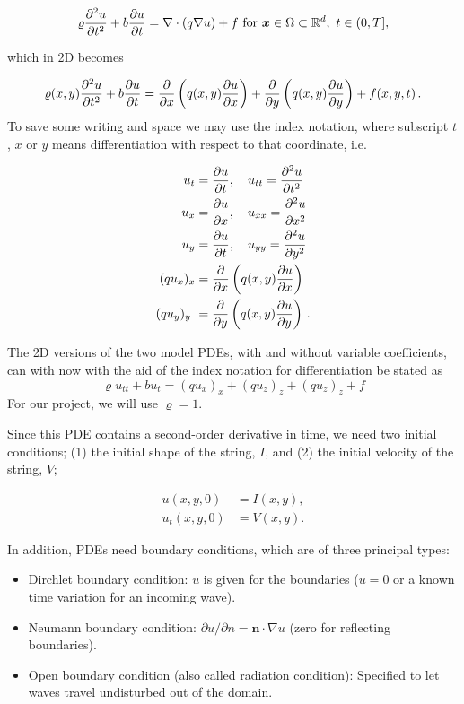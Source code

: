 \documentclass[letterpaper,10pt,english]{/usr/share/sphinx/texinputs/sphinxhowto}
\begin{document}
\[
\varrho\frac{\partial^2 u}{\partial t^2} +b \frac{\partial u}{\partial t} = \nabla\cdot (q\nabla u) + f\hbox{ for }\boldsymbol{x}\in\Omega\subset\mathbb{R}^d,\ t\in (0,T],
\]

which in 2D becomes

\[
\varrho(x,y)
\frac{\partial^2 u}{\partial t^2} +b \frac{\partial u}{\partial t} =
\frac{\partial}{\partial x}\left( q(x,y)
\frac{\partial u}{\partial x}\right)
+
\frac{\partial}{\partial y}\left( q(x,y)
\frac{\partial u}{\partial y}\right)
+ f(x,y,t)
\thinspace .
\] To save some writing and space we may use the index notation, where
subscript $t$, $x$ or $y$ means differentiation with respect to that
coordinate, i.e.

\begin{align*}
u_{t} &=\frac{\partial u}{\partial t} ,
\quad u_{tt} =\frac{\partial^2 u}{\partial t^2}\\
u_{x} &=\frac{\partial u}{\partial x} ,
\quad u_{xx} =\frac{\partial^2 u}{\partial x^2}\\
u_{y} &=\frac{\partial u}{\partial t} ,
\quad u_{yy} =\frac{\partial^2 u}{\partial y^2}\\
(q u_x)_x &= \frac{\partial}{\partial x}\left( q(x,y)
\frac{\partial u}{\partial x}\right)
\\
(q u_y)_y\ &=\frac{\partial}{\partial y}\left( q(x,y)
\frac{\partial u}{\partial y}\right)
\thinspace .
\end{align*}

The 2D versions of the two model PDEs, with and without variable
coefficients, can with now with the aid of the index notation for
differentiation be stated as \[
\varrho u_{tt} + b u_{t}= (q u_x)_x + (q u_z)_z + (q u_z)_z + f
\] For our project, we will use $\varrho = 1$.

Since this PDE contains a second-order derivative in time, we need two
initial conditions; (1) the initial shape of the string, $I$, and (2)
the initial velocity of the string, $V$;

\begin{align*}
u(x,y,0)&=I(x,y),\\
u_t(x,y,0)&=V(x,y).
\end{align*}

In addition, PDEs need boundary conditions, which are of three principal
types:

\begin{itemize}
\itemsep1pt\parskip0pt
\item
  Dirchlet boundary condition: $u$ is given for the boundaries ($u=0$ or
  a known time variation for an incoming wave).
\item
  Neumann boundary condition:
  $\partial u/\partial n = \boldsymbol{n}\cdot\nabla u$ (zero for
  reflecting boundaries).
\item
  Open boundary condition (also called radiation condition): Specified
  to let waves travel undisturbed out of the domain.
\end{itemize}
\end{document}
